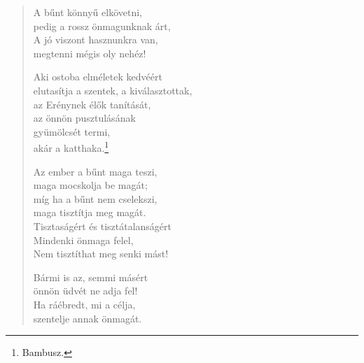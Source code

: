 \begin{verse}
 A bűnt könnyű elkövetni,\\
pedig a rossz önmagunknak árt,\\
A jó viszont hasznunkra van,\\
megtenni mégis oly nehéz!

 Aki ostoba elméletek kedvéért\\
elutasítja a szentek, a kiválasztottak,\\
az Erénynek élők tanítását,\\
az önnön pusztulásának\\
gyümölcsét termi,\\
akár a katthaka.\footnote{Bambusz.}

 Az ember a bűnt maga teszi,\\
maga mocskolja be magát;\\
míg ha a bűnt nem cselekszi,\\
maga tisztítja meg magát.\\
Tisztaságért és tisztátalanságért\\
Mindenki önmaga felel,\\
Nem tisztíthat meg senki mást!

 Bármi is az, semmi másért\\
önnön üdvét ne adja fel!\\
Ha ráébredt, mi a célja,\\
szentelje annak önmagát.

\end{verse}

